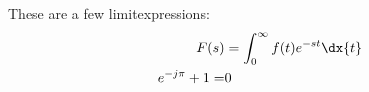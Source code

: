 These are a few limitexpressions:
\begin{align}
  F(s) &= \int_0^\infty f(t) e^{-st} \dx{t} \\
  e^{-j\pi}+1=&0
\end{align}
